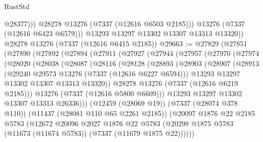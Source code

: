 \begin{lexlean}{RustStd}
\begin{coremodule}
                  @28377)))
            @28278
            @13276
            (@7337 (@12616 @6503 @2185)))
          @13276
          (@7337 (@12616 @6423 @6579)))
        @13293
        @13297
        @13302
        @13307
        @13313
        @13320))
    @28278
    @13276
    (@7337 (@12616 @6415 @2185))
@29663 := @27829
    (@27851
      (@27890
        (@27892
          (@27894
            (@27911
              (@27927
                (@27944
                  (@27957
                    (@27970
                      (@27974
                        (@28020
                          (@28038
                            (@28087
                              (@28116
                                (@28128
                                  (@28893
                                    (@28903
                                      (@28907
                                        (@28913
                                          (@29240 @29573 @13276 (@7337 (@12616 @6227 @6594)))
                                          @13293
                                          @13297
                                          @13302
                                          @13307
                                          @13313
                                          @13320))
                                      @28278
                                      @13276
                                      (@7337 (@12616 @6219 @2185)))
                                    @13276
                                    (@7337 (@12616 @5800 @6609)))
                                  @13293
                                  @13297
                                  @13302
                                  @13307
                                  @13313
                                  @26336)))
                            (@12459 (@28069 @19))
                            (@7337 (@28074 @378 @110))
                            (@11437 (@28081 @110 @65 @2261 @2185))
                            (@20097
                              @1876
                              @22
                              @2185
                              @5783
                              (@12672
                                @20096
                                @2027
                                @1876
                                @22
                                @5783
                                (@20298
                                  @1875
                                  @5783
                                  (@11673 (@11674 @5783))
                                  (@7337 (@11679 @1875 @22))))))

\end{coremodule}
\end{lexlean}
